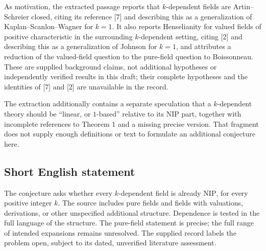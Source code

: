 \documentclass[11pt]{article}
\begin{document}
As motivation, the extracted passage reports that \(k\)-dependent fields are Artin--Schreier closed, citing its reference [7] and describing this as a generalization of Kaplan--Scanlon--Wagner for \(k=1\). It also reports Henselianity for valued fields of positive characteristic in the surrounding \(k\)-dependent setting, citing [2] and describing this as a generalization of Johnson for \(k=1\), and attributes a reduction of the valued-field question to the pure-field question to Boissonneau. These are supplied background claims, not additional hypotheses or independently verified results in this draft; their complete hypotheses and the identities of [7] and [2] are unavailable in the record.

The extraction additionally contains a separate speculation that a \(k\)-dependent theory should be ``linear, or \(1\)-based'' relative to its \(\mathrm{NIP}\) part, together with incomplete references to Theorem 1 and a missing precise version. That fragment does not supply enough definitions or text to formulate an additional conjecture here.
\subsection{Short English statement}
The conjecture asks whether every \(k\)-dependent field is already \(\mathrm{NIP}\), for every positive integer \(k\). The source includes pure fields and fields with valuations, derivations, or other unspecified additional structure. Dependence is tested in the full language of the structure. The pure-field statement is precise; the full range of intended expansions remains unresolved. The supplied record labels the problem open, subject to its dated, unverified literature assessment.
\end{document}
